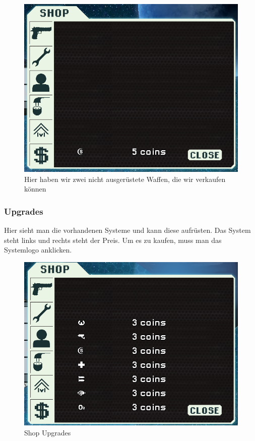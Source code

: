 \documentclass[fontsize=12pt,paper=a4,twoside]{scrartcl}
\begin{document}
\begin{figure}[H]
\centering
\includegraphics[width=1\linewidth]{DasSpiel/Shop/sys.png}
\caption{Hier haben wir zwei nicht ausgerüstete Waffen, die wir verkaufen können}
\end{figure}

\subsubsection{Upgrades}

Hier sieht man die vorhandenen Systeme und kann diese aufrüsten. Das System steht links und rechts steht der Preis. Um es zu kaufen, muss man das Systemlogo anklicken. 

\begin{figure}[H]
\centering
\includegraphics[width=1\linewidth]{DasSpiel/Shop/upgrades.png}
\caption{Shop Upgrades}
\end{figure}
\end{document}
